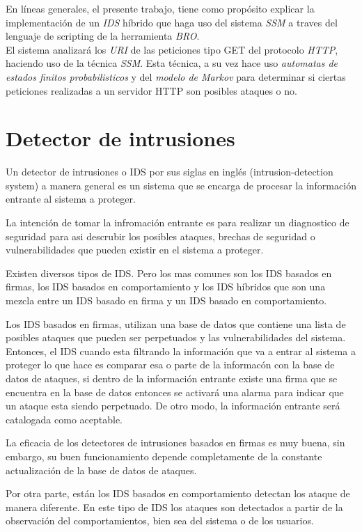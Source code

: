 \documentclass{article}
\begin{document}
En l\'ineas generales, el presente trabajo, tiene como prop\'osito explicar la implementaci\'on de un \textit{IDS} híbrido que haga uso del sistema \textit{SSM} a traves del lenguaje de scripting de la herramienta \textit{BRO}.\\

El sistema analizar\'a los \textit{URI} de las peticiones tipo GET del protocolo \textit{HTTP}, haciendo uso de la t\'ecnica \textit{SSM}. Esta t\'ecnica, a su vez hace uso \textit{automatas de estados finitos probabilisticos} y del \textit{modelo de Markov} para determinar si ciertas peticiones realizadas a un servidor HTTP son posibles ataques o no.


\section{Detector de intrusiones}

Un detector de intrusiones o IDS por sus siglas en ingl\'es (intrusion-detection system) a manera general es un sistema que se encarga de procesar la informaci\'on entrante al sistema a proteger.

La intenci\'on de tomar la infromaci\'on entrante es para realizar un diagnostico de seguridad para asi descrubir los posibles ataques, brechas de seguridad o vulnerabilidades que pueden existir en el sistema a proteger.

Existen diversos tipos de IDS. Pero los mas comunes son los IDS basados en firmas, los IDS basados en comportamiento y los IDS h\'ibridos que son una mezcla entre un IDS basado en firma y un IDS basado en comportamiento.

Los IDS basados en firmas, utilizan una base de datos que contiene una lista de posibles ataques que pueden ser perpetuados y las vulnerabilidades del sistema. Entonces, el IDS cuando esta filtrando la informaci\'on que va a entrar al sistema a proteger lo que hace es comparar esa o parte de la informac\'on con la base de datos de ataques, si dentro de la informaci\'on entrante existe una firma que se encuentra en la base de datos entonces se activar\'a una alarma para indicar que un ataque esta siendo perpetuado. De otro modo, la informaci\'on entrante ser\'a  catalogada como aceptable.

La eficacia de los detectores de intrusiones basados en firmas es muy buena, sin embargo, su buen funcionamiento depende completamente de la constante actualización de la base de datos de ataques.


Por otra parte, est\'an los IDS basados en comportamiento detectan los ataque de manera diferente. En este tipo de IDS los ataques son detectados a partir de la observaci\'on del comportamientos, bien sea del sistema o de los usuarios. 
\end{document}
